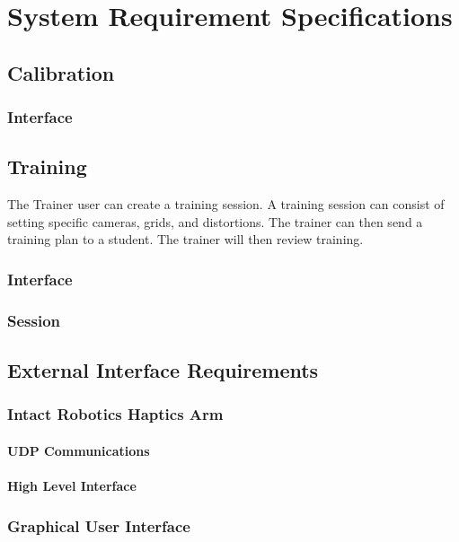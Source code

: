 \documentclass[11pt]{report}
\begin{document}
\chapter{System Requirement Specifications}

\section{Calibration}
\subsection{Interface}

\section{Training}

The Trainer user can create a training session. A training session can consist of setting specific cameras, grids, and distortions. The trainer can then send a training plan to a student. 
The trainer will then review training. 
 
\subsection{Interface}
\subsection{Session}

\section{External Interface Requirements}

\subsection{Intact Robotics Haptics Arm}

\subsubsection{UDP Communications}

\subsubsection{High Level Interface}

\subsection{Graphical User Interface}
\end{document}
